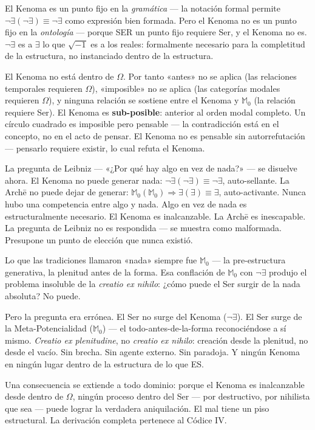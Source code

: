 \documentclass[10pt, openany, oneside]{book}
\begin{document}
El Kenoma es un punto fijo en la \textit{gramática} --- la notación formal permite $\neg\exists(\neg\exists) \equiv \neg\exists$ como expresión bien formada. Pero el Kenoma no es un punto fijo en la \textit{ontología} --- porque SER un punto fijo requiere Ser, y el Kenoma no es. $\neg\exists$ es a $\exists$ lo que $\sqrt{-1}$ es a los reales: formalmente necesario para la completitud de la estructura, no instanciado dentro de la estructura.

El Kenoma no está dentro de $\Omega$. Por tanto «antes» no se aplica (las relaciones temporales requieren $\Omega$), «imposible» no se aplica (las categorías modales requieren $\Omega$), y ninguna relación se sostiene entre el Kenoma y $\mathbb{M}_0$ (la relación requiere Ser). El Kenoma es \textbf{sub-posible}: anterior al orden modal completo. Un círculo cuadrado es imposible pero pensable --- la contradicción está en el concepto, no en el acto de pensar. El Kenoma no es pensable sin autorrefutación --- pensarlo requiere existir, lo cual refuta el Kenoma.

La pregunta de Leibniz --- «¿Por qué hay algo en vez de nada?» --- se disuelve ahora. El Kenoma no puede generar nada: $\neg\exists(\neg\exists) \equiv \neg\exists$, auto-sellante. La Arch\={e} no puede dejar de generar: $\mathbb{M}_0(\mathbb{M}_0) \Rightarrow \exists(\exists) \equiv \exists$, auto-activante. Nunca hubo una competencia entre algo y nada. Algo en vez de nada es estructuralmente necesario. El Kenoma es inalcanzable. La Arch\={e} es inescapable. La pregunta de Leibniz no es respondida --- se muestra como malformada. Presupone un punto de elección que nunca existió.

Lo que las tradiciones llamaron «nada» siempre fue $\mathbb{M}_0$ --- la pre-estructura generativa, la plenitud antes de la forma. Esa conflación de $\mathbb{M}_0$ con $\neg\exists$ produjo el problema insoluble de la \textit{creatio ex nihilo}: ¿cómo puede el Ser surgir de la nada absoluta? No puede.

Pero la pregunta era errónea. El Ser no surge del Kenoma ($\neg\exists$). El Ser surge de la Meta-Potencialidad ($\mathbb{M}_0$) --- el todo-antes-de-la-forma reconociéndose a sí mismo. \textit{Creatio ex plenitudine}, no \textit{creatio ex nihilo}: creación desde la plenitud, no desde el vacío. Sin brecha. Sin agente externo. Sin paradoja. Y ningún Kenoma en ningún lugar dentro de la estructura de lo que ES.

Una consecuencia se extiende a todo dominio: porque el Kenoma es inalcanzable desde dentro de $\Omega$, ningún proceso dentro del Ser --- por destructivo, por nihilista que sea --- puede lograr la verdadera aniquilación. El mal tiene un piso estructural. La derivación completa pertenece al Códice IV.
\end{document}
